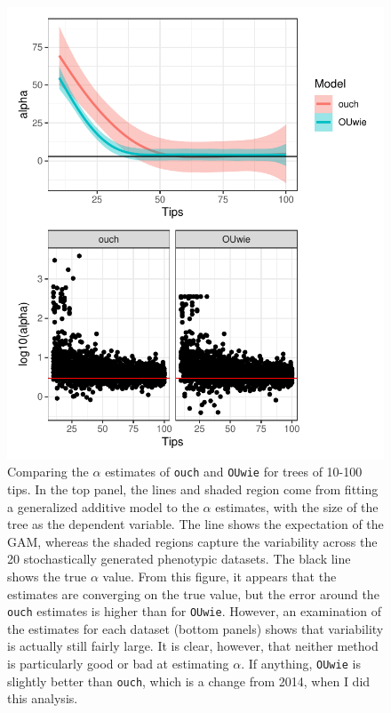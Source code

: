 \documentclass[12pt,reqno,final]{amsart}\usepackage[]{graphicx}\usepackage[]{color}
\makeatletter
\def\maxwidth{ %
  \ifdim\Gin@nat@width>\linewidth
    \linewidth
  \else
    \Gin@nat@width
  \fi
}
\newenvironment{kframe}{%
 \def\at@end@of@kframe{}%
 \ifinner\ifhmode%
  \def\at@end@of@kframe{\end{minipage}}%
  \begin{minipage}{\columnwidth}%
 \fi\fi%
 \def\FrameCommand##1{\hskip\@totalleftmargin \hskip-\fboxsep
 \colorbox{shadecolor}{##1}\hskip-\fboxsep
     \hskip-\linewidth \hskip-\@totalleftmargin \hskip\columnwidth}%
 \MakeFramed {\advance\hsize-\width
   \@totalleftmargin\z@ \linewidth\hsize
   \@setminipage}}%
 {\par\unskip\endMakeFramed%
 \at@end@of@kframe}
\newenvironment{knitrout}{}{} %
\theoremstyle{plain}
\numberwithin{equation}{part}
\makeatother
\begin{document}
\begin{knitrout}
\color{fgcolor}\begin{kframe}


{\ttfamily\noindent\itshape{}}\end{kframe}\begin{figure}
\includegraphics[width=\maxwidth]{figure/unnamed-chunk-1-1} \caption{Comparing the $\alpha$ estimates of \texttt{ouch} and \texttt{OUwie} for trees of 10-100 tips. In the top panel, the lines and shaded region come from fitting a generalized additive model to the $\alpha$ estimates, with the size of the tree as the dependent variable. The line shows the expectation of the GAM, whereas the shaded regions capture the variability across the 20 stochastically generated phenotypic datasets. The black line shows the true $\alpha$ value. From this figure, it appears that the estimates are converging on the true value, but the error around the \texttt{ouch} estimates is higher than for \texttt{OUwie}. However, an examination of the estimates for each dataset (bottom panels) shows that variability is actually still fairly large. It is clear, however, that neither method is particularly good or bad at estimating $\alpha$. If anything, \texttt{OUwie} is slightly better than \texttt{ouch}, which is a change from 2014, when I did this analysis.}\label{fig:unnamed-chunk-1}
\end{figure}


\end{knitrout}
\end{document}
